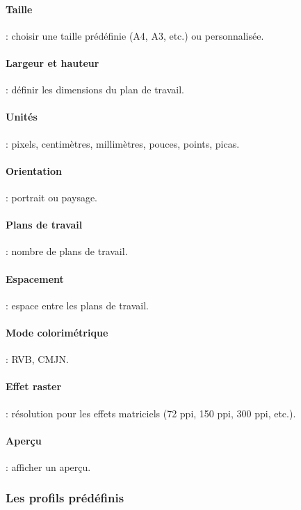 \paragraph{Taille} : choisir une taille prédéfinie (A4, A3, etc.) ou personnalisée.

\paragraph{Largeur et hauteur} : définir les dimensions du plan de travail.

\paragraph{Unités} : pixels, centimètres, millimètres, pouces, points, picas.

\paragraph{Orientation} : portrait ou paysage.

\paragraph{Plans de travail} : nombre de plans de travail.

\paragraph{Espacement} : espace entre les plans de travail.

\paragraph{Mode colorimétrique} : RVB, CMJN.

\paragraph{Effet raster} : résolution pour les effets matriciels (72 ppi, 150 ppi, 300 ppi, etc.).

\paragraph{Aperçu} : afficher un aperçu.

\subsubsection{Les profils prédéfinis}

